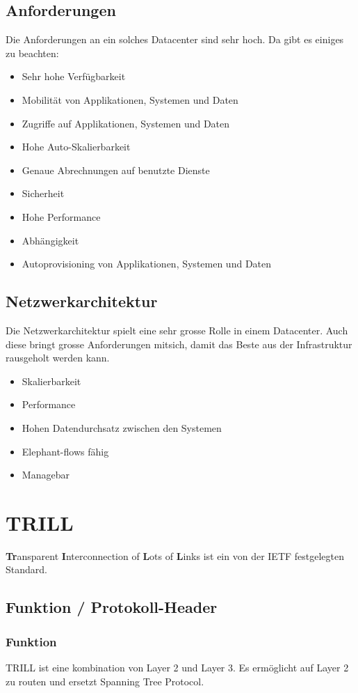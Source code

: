 \documentclass[a4,12pt]{scrartcl}
\begin{document}
\subsection{Anforderungen}
Die Anforderungen an ein solches Datacenter sind sehr hoch. Da gibt es einiges zu beachten: 
\begin{itemize}
\item Sehr hohe Verfügbarkeit 
\item Mobilität von Applikationen, Systemen und Daten
\item Zugriffe auf Applikationen, Systemen und Daten 
\item Hohe Auto-Skalierbarkeit 
\item Genaue Abrechnungen auf benutzte Dienste 
\item Sicherheit 
\item Hohe Performance 
\item Abhängigkeit 
\item Autoprovisioning von Applikationen, Systemen und Daten
\end{itemize}

\subsection{Netzwerkarchitektur}
Die Netzwerkarchitektur spielt eine sehr grosse Rolle in einem Datacenter. Auch diese bringt grosse Anforderungen mitsich, damit das Beste aus der Infrastruktur rausgeholt werden kann. 
\begin{itemize}
\item Skalierbarkeit
\item Performance 
\item Hohen Datendurchsatz zwischen den Systemen
\item Elephant-flows fähig 
\item Managebar 
\end{itemize}

\section{TRILL}
\textbf{Tr}ansparent \textbf{I}nterconnection of \textbf{L}ots of \textbf{L}inks ist ein von der IETF festgelegten Standard.
\subsection{Funktion / Protokoll-Header}
\subsubsection{Funktion}
TRILL ist eine kombination von Layer 2 und Layer 3. Es ermöglicht auf Layer 2 zu routen und ersetzt Spanning Tree Protocol.
\end{document}
